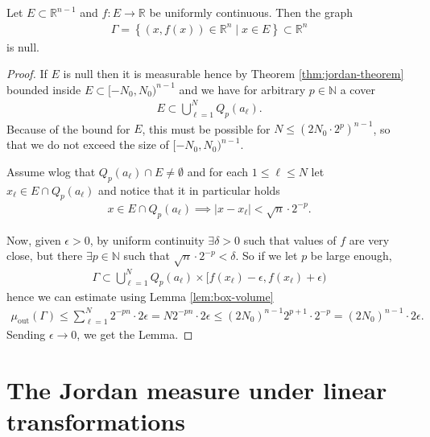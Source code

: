 \begin{lemma}\label{lem:graph-null}
	Let $E \subset \mathbb{R}^{n-1}$ and $f: E \to \mathbb{R}$ be uniformly continuous. Then the graph
	\begin{align*}
		\Gamma = \left\{ (x,f(x)) \in \mathbb{R}^{n} \mid x \in E \right\} \subset \mathbb{R}^{n}
	\end{align*}
	is null.
\end{lemma}
\begin{proof}
	If $E$ is null then it is measurable hence by Theorem \ref{thm:jordan-theorem} bounded inside $E \subset [-N_{0}, N_{0})^{n-1}$ and we have for arbitrary $p \in \mathbb{N}$ a cover
	\begin{align*}
		E \subset \bigcup_{\ell=1}^{N} Q_{p}(a_{\ell}).
	\end{align*}
	Because of the bound for $E$, this must be possible for $N \leq (2 N_{0} \cdot 2^{p})^{n-1}$, so that we do not exceed the size of $[-N_{0}, N_{0})^{n-1}$.

	Assume wlog that $Q_{p}(a_{\ell}) \cap E \neq \emptyset$ and for each $1 \leq \ell \leq N$ let $x_{\ell} \in E \cap Q_{p}(a_{\ell})$ and notice that it in particular holds
	\begin{align*}
		x \in E \cap Q_{p}(a_{\ell}) \implies \left| x-x_{\ell} \right| < \sqrt{n} \cdot 2^{-p}.
	\end{align*}

	Now, given $\epsilon > 0$, by uniform continuity $\exists \delta > 0$ such that values of $f$ are very close, but there $\exists p \in \mathbb{N}$ such that $\sqrt{n} \cdot 2^{-p} < \delta$. So if we let $p$ be large enough,
	\begin{align*}
		\Gamma \subset \bigcup_{\ell=1}^{N} Q_{p}(a_{\ell}) \times [f(x_{\ell}) - \epsilon, f(x_{\ell}) + \epsilon)
	\end{align*}
	hence we can estimate using Lemma \ref{lem:box-volume}
	\begin{align*}
		\mu_{\text{out}}(\Gamma ) \leq \sum_{\ell=1}^{N} 2^{-pn} \cdot 2\epsilon = N 2^{-pn} \cdot 2\epsilon \leq (2 N_{0})^{n-1} 2^{p+1} \cdot 2^{-p} = (2 N_{0})^{n-1} \cdot 2\epsilon.
	\end{align*}
	Sending $\epsilon \to 0$, we get the Lemma.
\end{proof}

\section{The Jordan measure under linear transformations}

